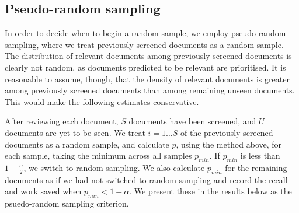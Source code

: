 \documentclass{bmcart}
\begin{document}
%	
%	


	\subsection*{Pseudo-random sampling}
	In order to decide when to begin a random sample, we employ pseudo-random sampling, where we treat previously screened documents as a random sample. The distribution of relevant documents among previously screened documents is clearly not random, as documents predicted to be relevant are prioritised. It is reasonable to assume, though, that the density of relevant documents is greater among previously screened documents than among remaining unseen documents. This would make the following estimates conservative. 
	
	After reviewing each document, $S$ documents have been screened, and $U$ documents are yet to be seen. We treat $i = 1 \dots S$ of the previously screened documents as a random sample, and calculate $p$, using the method above, for each sample, taking the minimum across all samples $p_{min}$. If $p_{min}$ is less than $1-\frac{\alpha}{2}$, we switch to random sampling. We also calculate $p_{min}$ for the remaining documents as if we had not switched to random sampling and record the recall and work saved when $p_{min} < 1 - \alpha$. We present these in the results below as the psuedo-random sampling criterion.
\end{document}
